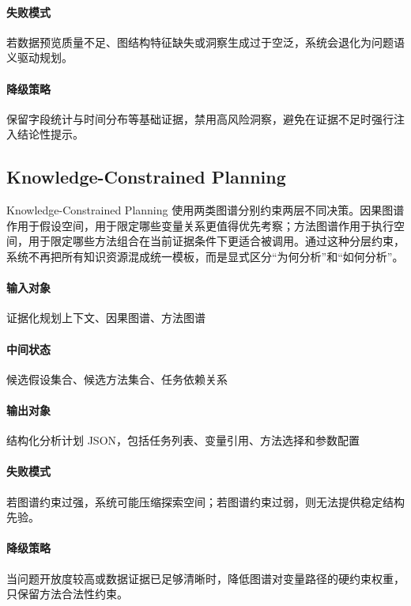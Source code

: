 \paragraph{失败模式}
若数据预览质量不足、图结构特征缺失或洞察生成过于空泛，系统会退化为问题语义驱动规划。

\paragraph{降级策略}
保留字段统计与时间分布等基础证据，禁用高风险洞察，避免在证据不足时强行注入结论性提示。

\subsection{Knowledge-Constrained Planning}

Knowledge-Constrained Planning 使用两类图谱分别约束两层不同决策。因果图谱作用于假设空间，用于限定哪些变量关系更值得优先考察；方法图谱作用于执行空间，用于限定哪些方法组合在当前证据条件下更适合被调用。通过这种分层约束，系统不再把所有知识资源混成统一模板，而是显式区分“为何分析”和“如何分析”\citep{liu2016knowledge,pan2024unifying,edge2024graphrag}。

\paragraph{输入对象}
证据化规划上下文、因果图谱、方法图谱

\paragraph{中间状态}
候选假设集合、候选方法集合、任务依赖关系

\paragraph{输出对象}
结构化分析计划 JSON，包括任务列表、变量引用、方法选择和参数配置

\paragraph{失败模式}
若图谱约束过强，系统可能压缩探索空间；若图谱约束过弱，则无法提供稳定结构先验。

\paragraph{降级策略}
当问题开放度较高或数据证据已足够清晰时，降低图谱对变量路径的硬约束权重，只保留方法合法性约束。

